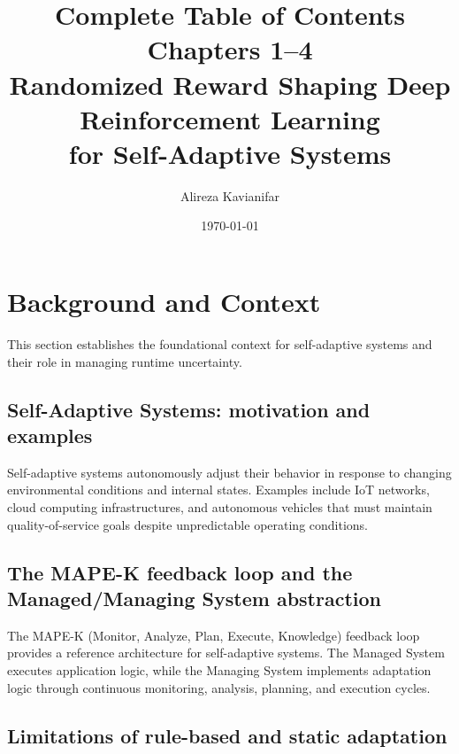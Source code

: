 \documentclass[11pt,a4paper]{article}
\title{Complete Table of Contents\\Chapters 1--4\\[0.3cm]\small{Randomized Reward Shaping Deep Reinforcement Learning\\for Self-Adaptive Systems}}
\author{Alireza Kavianifar}
\date{\today}
\begin{document}
\maketitle

\tableofcontents
\newpage


\setcounter{section}{0}
\renewcommand{\thesection}{1.\arabic{section}}
\renewcommand{\thesubsection}{1.\arabic{section}.\arabic{subsection}}
\renewcommand{\thesubsubsection}{1.\arabic{section}.\arabic{subsection}.\arabic{subsubsection}}

\section{Background and Context}

This section establishes the foundational context for self-adaptive systems and their role in managing runtime uncertainty.

\subsection{Self-Adaptive Systems: motivation and examples}

Self-adaptive systems autonomously adjust their behavior in response to changing environmental conditions and internal states. Examples include IoT networks, cloud computing infrastructures, and autonomous vehicles that must maintain quality-of-service goals despite unpredictable operating conditions.

\subsection{The MAPE-K feedback loop and the Managed/Managing System abstraction}

The MAPE-K (Monitor, Analyze, Plan, Execute, Knowledge) feedback loop provides a reference architecture for self-adaptive systems. The Managed System executes application logic, while the Managing System implements adaptation logic through continuous monitoring, analysis, planning, and execution cycles.

\subsection{Limitations of rule-based and static adaptation}
\end{document}

